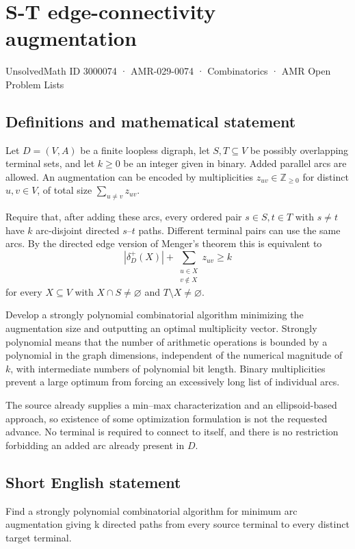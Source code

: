 \documentclass[11pt,a4paper]{article}
\begin{document}
\section*{S-T edge-connectivity augmentation}\label{3000074}
{\small UnsolvedMath ID 3000074 · AMR-029-0074 · Combinatorics · AMR Open Problem Lists}
\subsection{Definitions and mathematical statement}
Let $D=(V,A)$ be a finite loopless digraph, let $S,T\subseteq V$
be possibly overlapping terminal sets, and let $k\ge0$ be an integer
given in binary. Added parallel arcs are allowed. An augmentation can
be encoded by multiplicities $z_{uv}\in\mathbb Z_{\ge0}$ for distinct
$u,v\in V$, of total size $\sum_{u\ne v}z_{uv}$.

Require that, after adding these arcs, every ordered pair
$s\in S,t\in T$ with $s\ne t$ have $k$ arc-disjoint directed
$s$--$t$ paths. Different terminal pairs can use the same arcs.
By the directed edge version of Menger's theorem this is equivalent to
\[
 |\delta_D^+(X)|+
 \sum_{\substack{u\in X\\v\notin X}}z_{uv}\ge k
\]
for every $X\subseteq V$ with $X\cap S\ne\varnothing$ and
$T\setminus X\ne\varnothing$.

Develop a strongly polynomial combinatorial algorithm minimizing the
augmentation size and outputting an optimal multiplicity vector.
Strongly polynomial means that the number of arithmetic operations
is bounded by a polynomial in the graph dimensions, independent of
the numerical magnitude of $k$, with intermediate numbers of polynomial
bit length. Binary multiplicities prevent a large optimum from forcing
an excessively long list of individual arcs.

The source already supplies a min--max characterization and an
ellipsoid-based approach, so existence of some optimization formulation
is not the requested advance. No terminal is required to connect to
itself, and there is no restriction forbidding an added arc already
present in $D$.
\subsection{Short English statement}
Find a strongly polynomial combinatorial algorithm for minimum arc augmentation giving k directed paths from every source terminal to every distinct target terminal.
\end{document}
